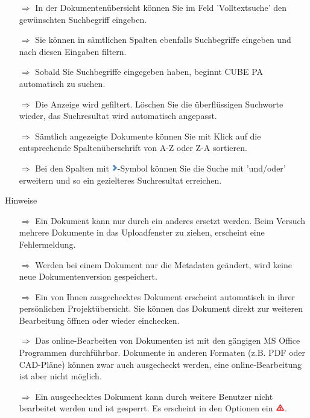\documentclass{article}
\begin{document}
\begin{multicols}{2}
\begin{tcolorbox}[colback=blue!5,colframe=blue!40!black,title=Finden von Dokumenten]
\begin{itemize}
  \item[$\Longrightarrow$] In der Dokumentenübersicht können Sie im Feld 'Volltextsuche' den gewünschten Suchbegriff eingeben.
  \item[$\Longrightarrow$] Sie können in sämtlichen Spalten ebenfalls Suchbegriffe eingeben und nach diesen Eingaben filtern.
  \item[$\Longrightarrow$] Sobald Sie Suchbegriffe eingegeben haben, beginnt CUBE PA automatisch zu suchen.
	\item[$\Longrightarrow$] Die Anzeige wird gefiltert. Löschen Sie die überflüssigen Suchworte wieder, das Suchresultat wird automatisch angepasst.
	\item[$\Longrightarrow$] Sämtlich angezeigte Dokumente können Sie mit Klick auf die entsprechende Spaltenüberschrift von A-Z oder Z-A sortieren.
	\item[$\Longrightarrow$] Bei den Spalten mit \includegraphics[height=9pt]{Icons/Pfeil_rechts.png}-Symbol können Sie die Suche mit 'und/oder' erweitern und so ein gezielteres Suchresultat erreichen.
\end{itemize}
\end{tcolorbox}


\end{multicols}



\begin{beamerlikethm}{Hinweise}
\begin{itemize}
  \item[$\Longrightarrow$] Ein Dokument kann nur durch ein anderes ersetzt werden. Beim Versuch mehrere Dokumente in das Uploadfenster zu ziehen, erscheint eine Fehlermeldung.
 \item[$\Longrightarrow$] Werden bei einem Dokument nur die Metadaten geändert, wird keine neue Dokumentenversion gespeichert.
 \item[$\Longrightarrow$] Ein von Ihnen ausgechecktes Dokument erscheint automatisch in ihrer persönlichen Projektübersicht. Sie können das Dokument direkt zur weiteren Bearbeitung öffnen oder wieder einchecken.
 \item[$\Longrightarrow$] Das online-Bearbeiten von Dokumenten ist mit den gängigen MS Office Programmen durchführbar. Dokumente in anderen Formaten (z.B. PDF oder CAD-Pläne) können
zwar auch ausgecheckt werden, eine online-Bearbeitung ist aber nicht möglich.
 \item[$\Longrightarrow$] Ein ausgechecktes Dokument kann durch weitere Benutzer nicht bearbeitet werden und ist gesperrt. Es erscheint in den Optionen ein \includegraphics[height=10pt]{Icons/Warnung_rot.png}.
\end{itemize}
\end{beamerlikethm}
\end{document}
